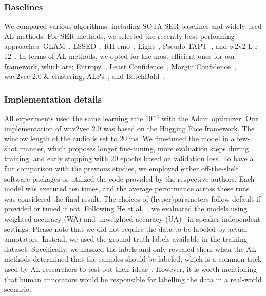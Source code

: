 \documentclass{article}
\begin{document}







\subsubsection{Baselines}

We compared various algorithms, including SOTA SER baselines and widely used AL methods. For SER methods, we selected the recently best-performing approaches: GLAM~\cite{9747517}, LSSED~\cite{9414542}, RH-emo~\cite{abs-2204-02385}, Light~\cite{Aftab}, Pseudo-TAPT~\cite{2110-06309}, and w2v2-L-r-12~\cite{10089511}. In terms of AL methods, we opted for the most efficient ones for our framework, which are: Entropy~\cite{roy2001toward}, Least Confidence~\cite{DredzeC08}, Margin Confidence~\cite{DredzeC08}, wav2vec 2.0 \&  clustering, ALPs~\cite{YuanLB20}, and BatchBald~\cite{KirschAG19}.







\subsubsection{Implementation details}

All experiments used the same learning rate $10^{-4}$ with the Adam optimizer. 
Our implementation of wav2vec 2.0 was based on the Hugging Face framework. The window length of the audio is set to 20 ms. 
We fine-tuned the model in a few-shot manner, which proposes longer fine-tuning, more evaluation steps during training, and early stopping with 20 epochs based on validation loss.
To have a fair comparison with the previous studies, we employed either off-the-shelf software packages or utilized the code provided by the respective authors. Each model was executed ten times, and the average performance across these runs was considered the final result. The choices of (hyper)parameters follow default if provided or tuned if not.
Following He et al.~\cite{10095777}, we evaluated the models using weighted accuracy (WA) and unweighted accuracy (UA)~\cite{metallinou2010decision} in speaker-independent settings. Please note that we did not require the data to be labeled by actual annotators. Instead,  we used the ground-truth labels available in the training dataset. Specifically, we masked the labels and only revealed them when the AL methods determined that the samples should be labeled, which is a common trick used by AL researchers to test out their ideas~\cite{roy2001toward}. However, it is worth mentioning that human annotators would be responsible for labelling the data in a real-world scenario.
\end{document}
